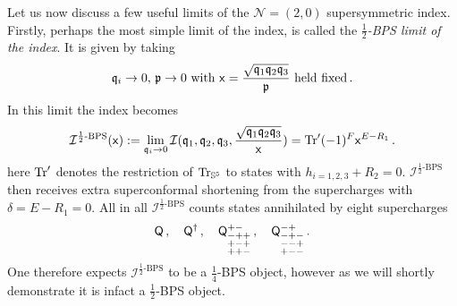 \documentclass[main.tex]{subfiles}
\begin{document}
Let us now discuss a few useful limits of the $\mathcal{N}=(2,0)$ supersymmetric index.  
Firstly, perhaps the most simple limit of the index, is called the \textit{$\frac{1}{2}$-BPS limit of the index}.  It is given by taking
\begin{equation}\label{eqn:intro6dhalfbps}
\text{$\mathfrak{q}_i\to0$, $\mathfrak{p}\to0$ with $\mathsf{x}=\frac{\sqrt{\mathfrak{q}_1\mathfrak{q}_2\mathfrak{q}_3}}{\mathfrak{p}}$ held fixed}\,.
\end{equation}
In this limit the index becomes
\begin{equation}
\mathcal{I}^{\text{$\frac{1}{2}$-BPS}}(\mathsf{x}):=\lim_{\mathfrak{q}_i\to0}\mathcal{I}(\mathfrak{q}_1,\mathfrak{q}_2,\mathfrak{q}_3,\frac{\sqrt{\mathfrak{q}_1\mathfrak{q}_2\mathfrak{q}_3}}{\mathsf{x}})=\operatorname{Tr}'(-1)^F\mathsf{x}^{E-R_1}\,.
\end{equation}
here $\operatorname{Tr}'$ denotes the restriction of $\operatorname{Tr}_{\mathbb{S}^5}$ to states with $h_{i=1,2,3}+R_2=0$.  $\mathcal{I}^{\text{$\frac{1}{2}$-BPS}}$ then receives extra superconformal shortening from the supercharges with $\delta=E-R_1=0$.  All in all $\mathcal{I}^{\text{$\frac{1}{2}$-BPS}}$ counts states annihilated by eight supercharges
\begin{equation}
\mathsf{Q}\,,\quad \mathsf{Q}^{\dagger}\,,\quad \mathsf{Q}^{+-}_{\substack{-++\\+-+\\++-}}\,,\quad \mathsf{Q}^{-+}_{\substack{-+-\\--+\\+--}}\,.
\end{equation}
One therefore expects $\mathcal{I}^{\text{$\frac{1}{2}$-BPS}}$ to be a $\frac{1}{4}$-BPS object, however as we will shortly demonstrate it is infact a $\frac{1}{2}$-BPS object.
\end{document}

